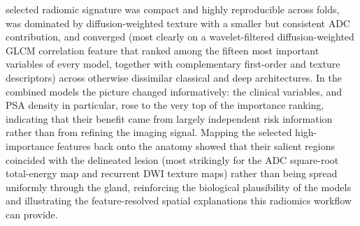\documentclass[11pt]{article}
\begin{document}
selected radiomic signature was compact and highly reproducible across folds, was
dominated by diffusion-weighted texture with a smaller but consistent ADC
contribution, and converged (most clearly on a wavelet-filtered diffusion-weighted
GLCM correlation feature that ranked among the fifteen most important variables of
every model, together with complementary first-order and texture descriptors)
across otherwise dissimilar classical and deep architectures. In the combined models the picture changed
informatively: the clinical variables, and PSA density in particular, rose to
the very top of the importance ranking, indicating that their benefit came from
largely independent risk information rather than from refining the imaging signal.
Mapping the selected high-importance features back onto the anatomy showed that
their salient regions coincided with the delineated lesion (most strikingly for
the ADC square-root total-energy map and recurrent DWI texture maps) rather than
being spread uniformly through the gland, reinforcing the biological plausibility of
the models and illustrating the feature-resolved spatial explanations this
radiomics workflow can provide.
\end{document}
